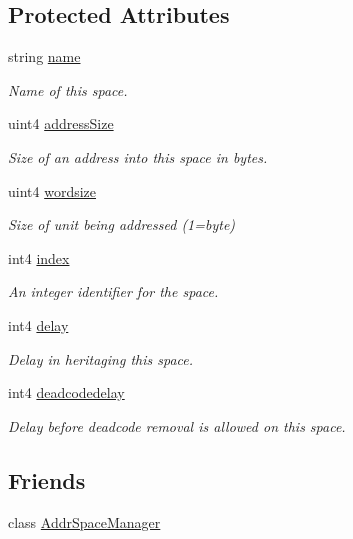 \subsection*{Protected Attributes}
\begin{DoxyCompactItemize}
\item 
string \mbox{\hyperlink{class_addr_space_aa0df0a80bf601ab9e4384a36e72f0c72}{name}}
\begin{DoxyCompactList}\small\item\em Name of this space. \end{DoxyCompactList}\item 
uint4 \mbox{\hyperlink{class_addr_space_a05c9b715d49d562e566ca392818fb798}{address\+Size}}
\begin{DoxyCompactList}\small\item\em Size of an address into this space in bytes. \end{DoxyCompactList}\item 
uint4 \mbox{\hyperlink{class_addr_space_a01a3c9c83f617703abed64d7c6de849a}{wordsize}}
\begin{DoxyCompactList}\small\item\em Size of unit being addressed (1=byte) \end{DoxyCompactList}\item 
int4 \mbox{\hyperlink{class_addr_space_ace333a37cd6fe6ae2c52cd9d64d7269e}{index}}
\begin{DoxyCompactList}\small\item\em An integer identifier for the space. \end{DoxyCompactList}\item 
int4 \mbox{\hyperlink{class_addr_space_adb1ad3a09f9860eac23dd34f910808cd}{delay}}
\begin{DoxyCompactList}\small\item\em Delay in heritaging this space. \end{DoxyCompactList}\item 
int4 \mbox{\hyperlink{class_addr_space_aa2fd37355d0ed2ebee552ac944f67d95}{deadcodedelay}}
\begin{DoxyCompactList}\small\item\em Delay before deadcode removal is allowed on this space. \end{DoxyCompactList}\end{DoxyCompactItemize}
\subsection*{Friends}
\begin{DoxyCompactItemize}
\item 
class \mbox{\hyperlink{class_addr_space_a0e578f3e90e10ec045899c0e9cb65d46}{Addr\+Space\+Manager}}
\end{DoxyCompactItemize}


